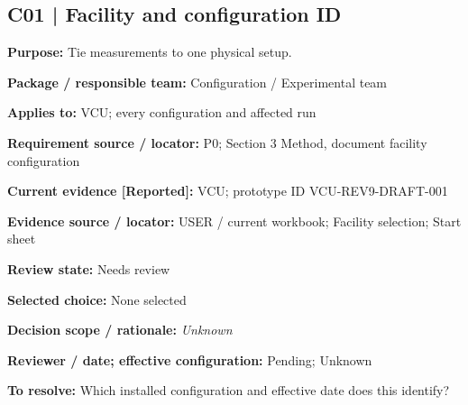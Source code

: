 \documentclass[11pt]{article}
\begin{document}
\begin{minipage}{\textwidth}\small\setlength{\parskip}{2pt}
\subsection*{C01 | Facility and configuration ID}
\textbf{Purpose:} Tie measurements to one physical setup.\par
\textbf{Package / responsible team:} Configuration / Experimental team\par
\textbf{Applies to:} VCU; every configuration and affected run\par
\textbf{Requirement source / locator:} P0; Section 3 Method, document facility configuration\par
\textbf{Current evidence [Reported]:} VCU; prototype ID VCU-REV9-DRAFT-001\par
\textbf{Evidence source / locator:} USER / current workbook; Facility selection; Start sheet\par
\textbf{Review state:} Needs review\par
\textbf{Selected choice:} None selected\par
\textbf{Decision scope / rationale:} \textit{Unknown}\par
\textbf{Reviewer / date; effective configuration:} Pending; Unknown\par
\textbf{To resolve:} Which installed configuration and effective date does this identify?\par
\end{minipage}\par\vspace{5pt}
\end{document}

